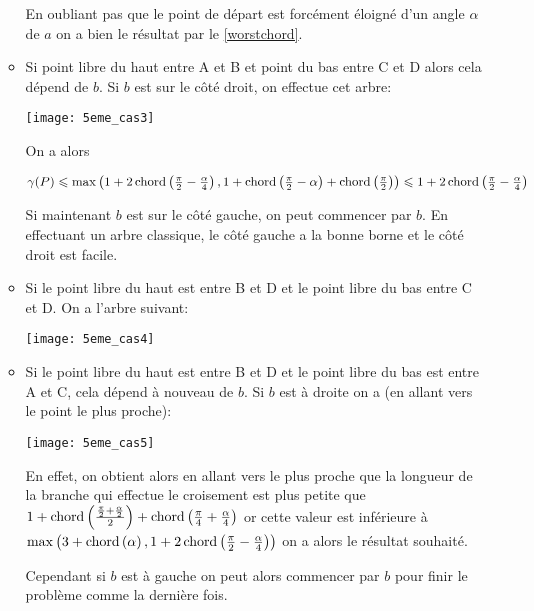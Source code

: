 \begin{itemize}
\begin{itemize}
En oubliant pas que le point de départ est forcément éloigné d'un angle $\alpha$ de $a$ on a bien le résultat par le \cref{worstchord}.

\item \label{5cas22} Si point libre du haut entre A et B et point du bas entre C et D alors cela dépend de $b$. Si $b$ est sur le côté droit, on effectue cet arbre:

  \texttt{[image: 5eme\_cas3]}

On a alors

$\gamma(P) \leqslant \max\left(1+2\operatorname{chord}\left(\frac{\pi}{2} - \frac{\alpha}{4}\right), 1 + \operatorname{chord}\left(\frac{\pi}{2} - \alpha\right) + \operatorname{chord}\left(\frac{\pi}{2}\right)\right) \leqslant 1+2\operatorname{chord}\left(\frac{\pi}{2} - \frac{\alpha}{4}\right)$

Si maintenant $b$ est sur le côté gauche, on peut commencer par $b$. En effectuant un arbre classique, le côté gauche a la bonne borne et le côté droit est facile.

\item \label{5cas23} Si le point libre du haut est entre B et D et le point libre du bas entre C et D. On a l'arbre suivant:

  \texttt{[image: 5eme\_cas4]}

\item \label{5cas24} Si le point libre du haut est entre B et D et le point libre du bas est entre A et C, cela dépend à nouveau de $b$. Si $b$ est à droite on a (en allant vers le point le plus proche):

  \texttt{[image: 5eme\_cas5]}

En effet, on obtient alors en allant vers le plus proche que la longueur de la branche qui effectue le croisement est plus petite que $1+\operatorname{chord}\left(\frac{\frac{\pi}{2} + \frac{\alpha}{2}}{2}\right) + \operatorname{chord}\left(\frac{\pi}{4} + \frac{\alpha}{4}\right)$ or cette valeur est inférieure à $\max\left(3 + \operatorname{chord}\left(\alpha\right), 1 + 2\operatorname{chord}\left(\frac{\pi}{2} - \frac{\alpha}{4}\right)\right)$ on a alors le résultat souhaité.

Cependant si $b$ est à gauche on peut alors commencer par $b$ pour finir le problème comme la dernière fois.

\end{itemize}
\end{itemize}

